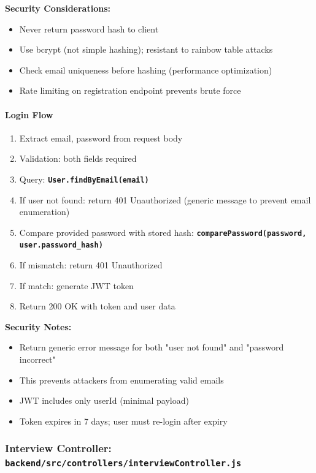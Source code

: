 \documentclass[12pt,a4paper,oneside]{article}
\newcommand{\fileref}[1]{\texttt{#1}}
\newcommand{\funcname}[1]{\texttt{\textbf{#1}}}
\begin{document}
\textbf{Security Considerations:}

\begin{itemize}
    \item Never return password hash to client
    \item Use bcrypt (not simple hashing); resistant to rainbow table attacks
    \item Check email uniqueness before hashing (performance optimization)
    \item Rate limiting on registration endpoint prevents brute force
\end{itemize}

\paragraph{Login Flow}

\begin{enumerate}
    \item Extract email, password from request body
    \item Validation: both fields required
    \item Query: \funcname{User.findByEmail(email)}
    \item If user not found: return 401 Unauthorized (generic message to prevent email enumeration)
    \item Compare provided password with stored hash: \funcname{comparePassword(password, user.password\_hash)}
    \item If mismatch: return 401 Unauthorized
    \item If match: generate JWT token
    \item Return 200 OK with token and user data
\end{enumerate}

\textbf{Security Notes:}

\begin{itemize}
    \item Return generic error message for both "user not found" and "password incorrect"
    \item This prevents attackers from enumerating valid emails
    \item JWT includes only userId (minimal payload)
    \item Token expires in 7 days; user must re-login after expiry
\end{itemize}

\subsubsection{Interview Controller: \fileref{backend/src/controllers/interviewController.js}}
\end{document}
